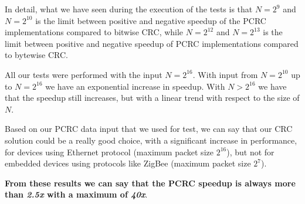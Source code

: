 \documentclass[fleqn]{IEEEtran}
\begin{document}
In detail, what we have seen during the execution of the tests is that 
$N=2^{9}$ and $N=2^{10}$ is the limit between positive and negative speedup of 
the PCRC implementations compared to bitwise CRC, while $N=2^{12}$ and $N=2^{13}$ 
is the limit between positive and negative speedup of PCRC implementations 
compared to bytewise CRC.

All our tests were performed with the input $N=2^{16}$. With input from 
$N=2^{10}$ up to $N=2^{16}$ we have an exponential increase in 
speedup. With $N>2^{16}$ we have that the speedup still increases, 
but with a linear trend with respect to the size of $N$.

Based on our PCRC data input that we used for test, we can say that our CRC solution could be a really good choice, with a significant increase in performance, for devices using 
Ethernet protocol (maximum packet size $2^{16}$), but not for embedded devices 
using protocols like ZigBee (maximum packet size $2^{7}$).

\textbf{From these results we can say that the PCRC speedup is always more than \textit{2.5x} with a maximum of \textit{40x}}.
\end{document}
